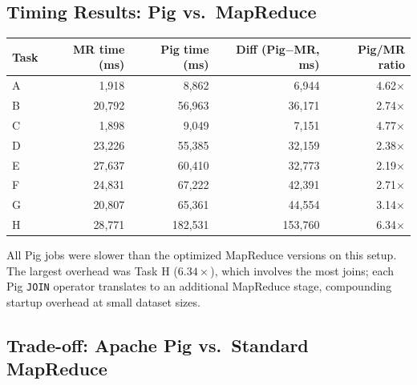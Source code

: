 \documentclass[11pt]{article}
\begin{document}
\subsection{Timing Results: Pig vs.\ MapReduce}

\begin{longtable}{@{}lrrrr@{}}
  \rowcolor{tableheader}
  \color{white}\textbf{Task} &
  \color{white}\textbf{MR time (ms)} &
  \color{white}\textbf{Pig time (ms)} &
  \color{white}\textbf{Diff (Pig$-$MR, ms)} &
  \color{white}\textbf{Pig/MR ratio} \\
  \midrule\endhead
  A & 1{,}918  & 8{,}862   & 6{,}944   & 4.62$\times$ \\
  \rowcolor{tablealt}
  B & 20{,}792 & 56{,}963  & 36{,}171  & 2.74$\times$ \\
  C & 1{,}898  & 9{,}049   & 7{,}151   & 4.77$\times$ \\
  \rowcolor{tablealt}
  D & 23{,}226 & 55{,}385  & 32{,}159  & 2.38$\times$ \\
  E & 27{,}637 & 60{,}410  & 32{,}773  & 2.19$\times$ \\
  \rowcolor{tablealt}
  F & 24{,}831 & 67{,}222  & 42{,}391  & 2.71$\times$ \\
  G & 20{,}807 & 65{,}361  & 44{,}554  & 3.14$\times$ \\
  \rowcolor{tablealt}
  H & 28{,}771 & 182{,}531 & 153{,}760 & 6.34$\times$ \\
\end{longtable}

\begin{tcolorbox}[finding]
All Pig jobs were slower than the optimized MapReduce versions on this setup. The largest overhead was Task H ($6.34\times$), which involves the most joins; each Pig \texttt{JOIN} operator translates to an additional MapReduce stage, compounding startup overhead at small dataset sizes.
\end{tcolorbox}

\subsection{Trade-off: Apache Pig vs.\ Standard MapReduce}
\end{document}
